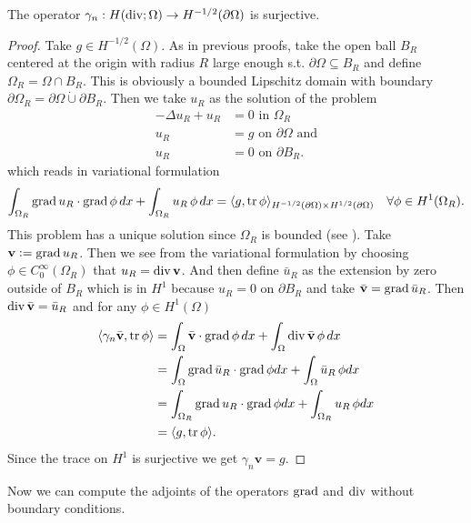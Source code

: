 \documentclass[../master_thesis.tex]{subfiles}
\begin{document}
\begin{theorem}
    The operator $\gamma_n: H(\operatorname{div}; \Omega) \rightarrow H^{-1/2}(\partial\Omega)$ 
    is surjective.
\end{theorem}
\begin{proof}
    Take $g \in H^{-1/2}(\Omega)$. As in previous proofs, take 
    the open ball $B_R$ centered at the origin with radius $R$ large enough 
    s.t. $\partial \Omega\subseteq B_R$ and define $\Omega_R = \Omega \cap B_R$.
    This is obviously a bounded Lipschitz domain with boundary 
    $\partial \Omega_R = \partial \Omega \dot{\cup} \partial B_R$.
    Then we take $u_R$ as the solution 
    of the problem 
    \begin{align*}
        -\Delta u_R + u_R &= 0 \text{ in $\Omega_R$} \\
        u_R &= g \text{ on $\partial \Omega$ and} 
        \\ u_R &= 0 \text{ on $\partial B_R$.} 
    \end{align*}
    which reads in variational formulation
    \begin{align*}
        \int_{\Omega_R} \operatorname{grad} u_R \cdot \operatorname{grad} \phi \, dx + \int_{\Omega_R} u_R \, \phi \,dx 
        = \langle g, \operatorname{tr} \phi \rangle_{H^{-1/2}(\partial \Omega) \times H^{1/2}(\partial \Omega)} \quad \forall \phi \in H^1(\Omega_R).
    \end{align*}
    This problem has a unique solution since $\Omega_R$ is bounded (see \cite[Thm. 3.12]{monk}).
    Take $\mathbf{v} \vcentcolon= \operatorname{grad} u_R$. Then we see from the variational 
    formulation by choosing $\phi \in C_0^\infty(\Omega_R)$ that $u_R = \operatorname{div} \mathbf{v}$.
    And then define $\bar{u}_R$ as the extension by zero outside of $B_R$ which is in $H^1$ 
    because $u_R = 0$ on $\partial B_R$ and take $\bar{\mathbf{v}} = \operatorname{grad} \bar{u}_R$. 
    Then $\operatorname{div} \bar{\mathbf{v}} = \bar{u}_R$
    and for any $\phi \in H^1(\Omega)$
    \begin{align*}
        \langle \gamma_n \bar{\mathbf{v}}, \operatorname{tr} \phi \rangle 
        &= \int_\Omega \bar{\mathbf{v}} \cdot \operatorname{grad} \phi \, dx 
            + \int_\Omega \operatorname{div} \bar{\mathbf{v}} \, \phi \, dx
        \\ &= \int_\Omega \operatorname{grad} \bar{u}_R \cdot \operatorname{grad} \phi dx
            + \int_\Omega \bar{u}_R \, \phi dx 
        \\ &= \int_{\Omega_R} \operatorname{grad} u_R \cdot \operatorname{grad} \phi dx
            + \int_{\Omega_R} u_R \, \phi dx 
        \\ &= \langle g, \operatorname{tr} \phi \rangle.
    \end{align*}
    Since the trace on $H^1$ is surjective we get $\gamma_n \mathbf{v} = g$.
\end{proof}
Now we can compute the adjoints of the operators $\operatorname{grad}$ and $\operatorname{div}$ without boundary conditions.
\end{document}
